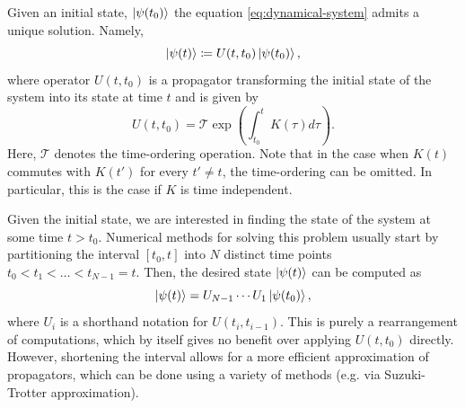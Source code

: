 Given an initial state, $\ket{\psi(t_0)}$ the equation \eqref{eq:dynamical-system}
admits a unique solution. Namely,
\begin{equation}
	\ket{\psi(t)} \coloneqq U(t, t_0) \ket{\psi(t_0)},
\end{equation}
where operator $U(t, t_0)$ is a propagator transforming the initial state of
the system into its state at time $t$ and is given by
\begin{equation}
	\label{eq:propagator}
	U(t, t_0) = \mathcal{T} \exp \left( \int_{t_0}^t K(\tau)d\tau \right).
\end{equation}
Here, $\mathcal{T}$ denotes the time-ordering operation.
Note that in the case when $K(t)$ commutes with $K(t')$ for every $t' \ne t$, the
time-ordering can be omitted. In particular, this is the case if $K$ is time
independent.

Given the initial state, we are interested in finding the state of the
system at some time $t > t_0$. Numerical methods for solving this problem
usually start by partitioning the interval $[t_0, t]$ into $N$ distinct time
points $t_0 < t_1 < \ldots < t_{N-1} = t$. Then, the desired state $\ket{\psi(t)}$
can be computed as
%
\begin{equation}
	\ket{\psi(t)} = U_{N-1} \cdots U_1 \ket{\psi(t_0)},
\end{equation}
%
where $U_i$ is a shorthand notation for $U(t_i, t_{i-1})$. This is purely a rearrangement of
computations, which by itself gives no benefit over applying $U(t, t_0)$ directly. However,
shortening the interval allows for a more efficient approximation of propagators, which can be done
using a variety of methods (e.g. via Suzuki-Trotter approximation).

